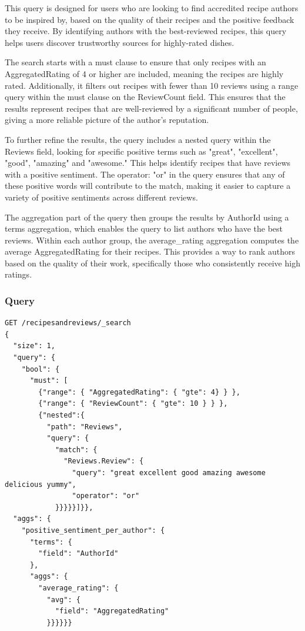 \begin{enumerate}
    This query is designed for users who are looking to find accredited recipe authors to be inspired by, based on the quality of their recipes and the positive feedback they receive. By identifying authors with the best-reviewed recipes, this query helps users discover trustworthy sources for highly-rated dishes.

    The search starts with a must clause to ensure that only recipes with an AggregatedRating of 4 or higher are included, meaning the recipes are highly rated. Additionally, it filters out recipes with fewer than 10 reviews using a range query within the must clause on the ReviewCount field. This ensures that the results represent recipes that are well-reviewed by a significant number of people, giving a more reliable picture of the author's reputation.

    To further refine the results, the query includes a nested query within the Reviews field, looking for specific positive terms such as "great", "excellent", "good", "amazing" and "awesome." This helps identify recipes that have reviews with a positive sentiment. The operator: "or" in the query ensures that any of these positive words will contribute to the match, making it easier to capture a variety of positive sentiments across different reviews.

    The aggregation part of the query then groups the results by AuthorId using a terms aggregation, which enables the query to list authors who have the best reviews. Within each author group, the average\_rating aggregation computes the average AggregatedRating for their recipes. This provides a way to rank authors based on the quality of their work, specifically those who consistently receive high ratings.

    \subsubsection{Query}
    \begin{lstlisting}[language=Elasticsearch]
GET /recipesandreviews/_search
{
  "size": 1,
  "query": {
    "bool": {
      "must": [
        {"range": { "AggregatedRating": { "gte": 4} } },
        {"range": { "ReviewCount": { "gte": 10 } } },
        {"nested":{
          "path": "Reviews",
          "query": {
            "match": {
              "Reviews.Review": {
                "query": "great excellent good amazing awesome delicious yummy",
                "operator": "or"
            }}}}}]}},
  "aggs": {
    "positive_sentiment_per_author": {
      "terms": {
        "field": "AuthorId"
      },
      "aggs": {
        "average_rating": {
          "avg": {
            "field": "AggregatedRating"
          }}}}}}
    \end{lstlisting}


\end{enumerate}
